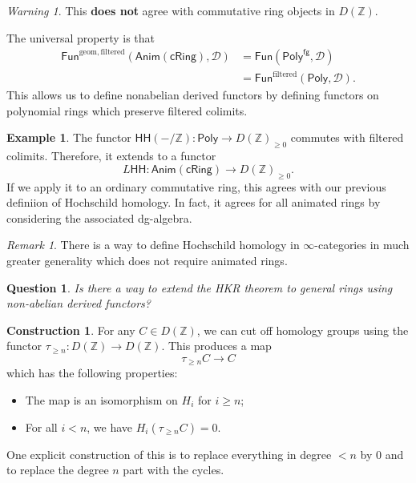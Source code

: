 \documentclass[10pt]{amsart}
\newtheorem{quest}[thm]{Question}
\theoremstyle{definition}
\newtheorem{con}[thm]{Construction}
\newtheorem{exm}[thm]{Example}
\theoremstyle{remark}
\newtheorem{rmk}[thm]{Remark}
\newtheorem{warn}[thm]{Warning}
\theoremstyle{plain}
\theoremstyle{definition}
\theoremstyle{remark}
\newcommand{\Z}{\mathbb{Z}}
\newcommand{\mc}[1]{\mathcal{#1}}
\newcommand{\mr}[1]{\mathrm{#1}}
\newcommand{\ms}[1]{\mathsf{#1}}
\newcommand{\1}{\mathbf{1}}
\newcommand{\2}{\mathbf{2}}
\newcommand{\3}{\mathbf{3}}
\newcommand{\HH}{\ms{HH}}
\begin{document}
\begin{warn}
    This \textbf{does not} agree with commutative ring objects in $D(\Z)$.
\end{warn}

The universal property is that
\begin{align*}
    \ms{Fun}^{\mr{geom,filtered}}(\ms{Anim}(\ms{cRing}), \mc{D}) &= \ms{Fun}(\ms{Poly}^{\ms{fg}}, \mc{D}) \\
    &= \ms{Fun}^{\mr{filtered}}(\ms{Poly}, \mc{D}).
\end{align*}
This allows us to define nonabelian derived functors by defining functors on polynomial rings which preserve filtered colimits.

\begin{exm}
    The functor $\HH(-/\Z) \colon \ms{Poly} \to D(\Z)_{\geq 0}$ commutes with filtered colimits. Therefore, it extends to a functor
    \[ L\HH \colon \ms{Anim}(\ms{cRing}) \to D(\Z)_{\geq 0}. \]
    If we apply it to an ordinary commutative ring, this agrees with our previous definiion of Hochschild homology. In fact, it agrees for all animated rings by considering the associated dg-algebra.
\end{exm}

\begin{rmk}
    There is a way to define Hochschild homology in $\infty$-categories in much greater generality which does not require animated rings.
\end{rmk}

\begin{quest}
    Is there a way to extend the HKR theorem to general rings using non-abelian derived functors?
\end{quest}

\begin{con}
    For any $C \in D(\Z)$, we can cut off homology groups using the functor $\tau_{\geq n} \colon D(\Z) \to D(\Z)$. This produces a map
    \[ \tau_{\geq n} C \to C \]
    which has the following properties:
    \begin{itemize}
        \item The map is an isomorphism on $H_i$ for $i \geq n$;
        \item For all $i < n$, we have $H_i(\tau_{\geq n} C) = 0$.
    \end{itemize}
    One explicit construction of this is to replace everything in degree $<n$ by $0$ and to replace the degree $n$ part with the cycles.
\end{con}
\end{document}
